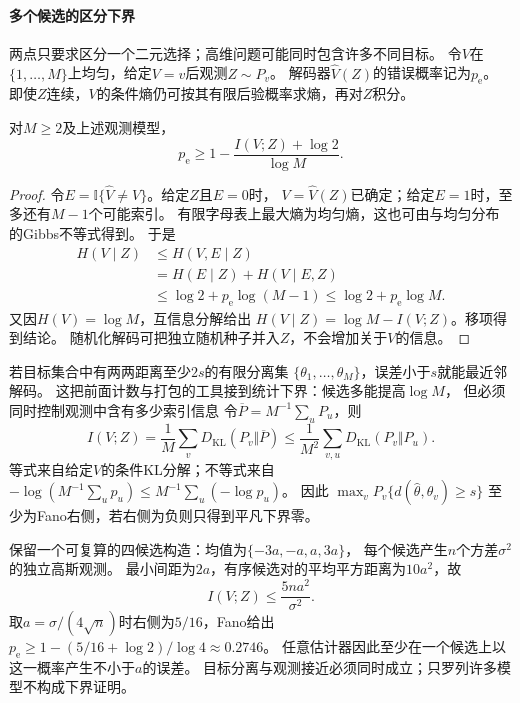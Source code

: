 \paragraph{多个候选的区分下界}
\label{sec:information-many-candidates}

两点只要求区分一个二元选择；高维问题可能同时包含许多不同目标。
令\(V\)在\(\{1,\ldots,M\}\)上均匀，给定\(V=v\)后观测\(Z\sim P_v\)。
解码器\(\widehat V(Z)\)的错误概率记为\(p_{\mathrm e}\)。
即使\(Z\)连续，\(V\)的条件熵仍可按其有限后验概率求熵，再对\(Z\)积分。

\begin{theorem}[Fano不等式]
\label{thm:information-fano}
对\(M\geq2\)及上述观测模型，
\begin{equation}
  p_{\mathrm e}\geq1-\frac{I(V;Z)+\log2}{\log M}.
  \label{eq:information-fano}
\end{equation}
\end{theorem}
\begin{proof}
令\(E=\mathbb I\{\widehat V\neq V\}\)。给定\(Z\)且\(E=0\)时，
\(V=\widehat V(Z)\)已确定；给定\(E=1\)时，至多还有\(M-1\)个可能索引。
有限字母表上最大熵为均匀熵，这也可由与均匀分布的Gibbs不等式得到。
于是
\[
\begin{aligned}
  H(V\mid Z)
  &\leq H(V,E\mid Z)\\
  &=H(E\mid Z)+H(V\mid E,Z)\\
  &\leq\log2+p_{\mathrm e}\log(M-1)
   \leq\log2+p_{\mathrm e}\log M.
\end{aligned}
\]
又因\(H(V)=\log M\)，互信息分解给出
\(H(V\mid Z)=\log M-I(V;Z)\)。移项得到结论。
随机化解码可把独立随机种子并入\(Z\)，不会增加关于\(V\)的信息。
\end{proof}

若目标集合中有两两距离至少\(2s\)的有限分离集
\(\{\theta_1,\ldots,\theta_M\}\)，误差小于\(s\)就能最近邻解码。
这把前面计数与打包的工具接到统计下界：候选多能提高\(\log M\)，
但必须同时控制观测中含有多少索引信息
令\(\overline P=M^{-1}\sum_uP_u\)，则
\[
  I(V;Z)=\frac1M\sum_vD_{\mathrm{KL}}(P_v\Vert\overline P)
  \leq\frac1{M^2}\sum_{v,u}D_{\mathrm{KL}}(P_v\Vert P_u).
\]
等式来自给定\(V\)的条件KL分解；不等式来自
\(-\log(M^{-1}\sum_u p_u)\leq M^{-1}\sum_u(-\log p_u)\)。
因此
\(\max_vP_v\{d(\widehat\theta,\theta_v)\geq s\}\)
至少为Fano右侧，若右侧为负则只得到平凡下界零。

保留一个可复算的四候选构造：均值为\(\{-3a,-a,a,3a\}\)，
每个候选产生\(n\)个方差\(\sigma^2\)的独立高斯观测。
最小间距为\(2a\)，有序候选对的平均平方距离为\(10a^2\)，故
\[
  I(V;Z)\leq\frac{5na^2}{\sigma^2}.
\]
取\(a=\sigma/(4\sqrt n)\)时右侧为\(5/16\)，Fano给出
\(p_{\mathrm e}\geq1-(5/16+\log2)/\log4\approx0.2746\)。
任意估计器因此至少在一个候选上以这一概率产生不小于\(a\)的误差。
目标分离与观测接近必须同时成立；只罗列许多模型不构成下界证明。

